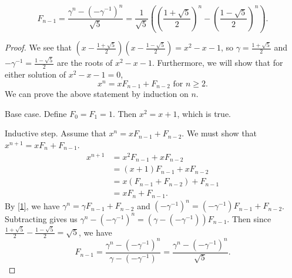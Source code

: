 \documentclass{article}
\begin{document}
\begin{enumerate}[label=(\alph*)]
    \[F_{n-1}=\frac{\gamma^n-(-\gamma^{-1})^n}{\sqrt{5}}=\frac{1}{\sqrt{5}}\left(\left(\frac{1+\sqrt{5}}{2}\right)^n-\left(\frac{1-\sqrt{5}}{2}\right)^n\right).\]
    \begin{proof}
    We see that $(x-\frac{1+\sqrt{5}}{2})(x-\frac{1-\sqrt{5}}{2})=x^2-x-1$, so $\gamma = \frac{1+\sqrt{5}}{2}$ and $-\gamma^{-1} = \frac{1-\sqrt{5}}{2}$ are the roots of $x^2-x-1$. Furthermore, we will show that for either solution of $x^2-x-1=0$, 
    \[x^n = xF_{n-1}+F_{n-2} \text{ for } n\geq 2.\tag{1}\label{1}\]
    We can prove the above statement by induction on $n$.
    \par Base case. Define $F_0=F_1=1$. Then $x^2=x+1$, which is true.
    \par Inductive step. Assume that $x^{n} = xF_{n-1}+F_{n-2}$. We must show that $x^{n+1} = xF_{n}+F_{n-1}$.
    \begin{align*} 
        x^{n+1} &= x^{2}F_{n-1}+xF_{n-2} \\
        &= (x+1)F_{n-1} + xF_{n-2} \\
        &= x(F_{n-1}+F_{n-2})+F_{n-1} \\
        &= xF_{n} + F_{n-1}.
    \end{align*}
    By \eqref{1}, we have $\gamma^{n} = \gamma F_{n-1}+F_{n-2}$ and $(-\gamma^{-1})^{n} = (-\gamma^{-1})F_{n-1}+F_{n-2}$. Subtracting gives us $\gamma^n-(-\gamma^{-1})^n=(\gamma-(-\gamma^{-1}))F_{n-1}$. Then since $\frac{1+\sqrt{5}}{2}-\frac{1-\sqrt{5}}{2}=\sqrt{5}$, we have 
    \[F_{n-1}=\frac{\gamma^n-(-\gamma^{-1})^n}{\gamma-(-\gamma^{-1})}=\frac{\gamma^n-(-\gamma^{-1})^n}{\sqrt{5}}.\]
    \end{proof}
\end{enumerate}
\end{document}
